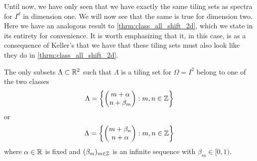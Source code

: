 \documentclass[../thesis.tex]{subfiles}
\begin{document}
Until now, we have only seen that we have exactly the same tiling sets as spectra for $I^d$ in dimension one. We will now see that the same is true for dimension two. Here we have an analogous result to \cref{thrm:class_all_shift_2d}, which we state in its entirety for convenience. It is worth emphasizing that it, in this case, is as a consequence of Keller's  that we have that these tiling sets must also look like they do in \cref{thrm:class_all_shift_2d}.

\begin{theorem}\label{thrm:class_all_tiling_2d}  %
    The only subsets $\Lambda \subset \mathbb{R}^2$ such that $\Lambda$ is a tiling set for $\Omega = I^2$ belong to one of the two classes
    \begin{equation}\label{eq:2d_all_shift_class_1_tiling}
        \Lambda = \left\{
            \begin{pmatrix}
            m + \alpha \\
            n + \beta_m
            \end{pmatrix} : m,n \in  \mathbb{Z}
            \right\}
    \end{equation}
    or
    \begin{equation}\label{eq:2d_all_shift_class_2_tiling}
        \Lambda = \left\{
            \begin{pmatrix}
            m + \beta_n\\
            n + \alpha
            \end{pmatrix} : m,n \in  \mathbb{Z}
            \right\}
    \end{equation}
    where $\alpha \in \mathbb{R}$ is fixed and $(\beta_m)_{m\in \mathbb{Z}}$ is an infinite sequence with $\beta_m \in [0,1)$.
\end{theorem}
\end{document}

